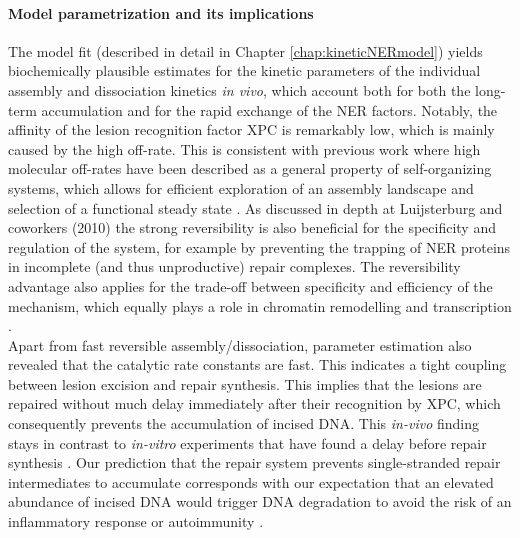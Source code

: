 \paragraph{Model parametrization and its implications}
The model fit (described in detail in Chapter \ref{chap:kineticNERmodel}) yields biochemically plausible estimates for the kinetic parameters of the individual assembly and dissociation kinetics \textit{in vivo}, which account both for both the long-term accumulation and for the rapid exchange of the NER factors. Notably, the affinity of the lesion recognition factor XPC is remarkably low, which is mainly caused by the high off-rate. This is consistent with previous work where high molecular off-rates have been described as a general property of self-organizing systems, which allows for efficient exploration of an assembly landscape and selection of a functional steady state \cite{Kirschner2000}. As discussed in depth at Luijsterburg and coworkers (2010)\cite{Luijsterburg2010} the strong reversibility is also beneficial for the specificity and regulation of the system, for example by preventing the trapping of NER proteins in incomplete (and thus unproductive) repair complexes. The reversibility advantage also applies for the trade-off between specificity and efficiency of the mechanism, which equally plays a role in chromatin remodelling and transcription \cite{Cook2010,Voss2011}.\\
Apart from fast reversible assembly/dissociation, parameter estimation also revealed that the catalytic rate constants are fast. This indicates a tight coupling between lesion excision and repair synthesis. This implies that the lesions are repaired without much delay immediately after their recognition by XPC, which consequently prevents the accumulation of incised DNA. This \textit{in-vivo} finding stays in contrast to \textit{in-vitro} experiments that have found a delay before repair synthesis \cite{Mocquet2008,Riedl2003}. Our prediction that the repair system prevents single-stranded repair intermediates to accumulate corresponds with our expectation that an elevated abundance of incised DNA would trigger DNA degradation to avoid the risk of an inflammatory response or autoimmunity \cite{Takeuchi2010}.             



